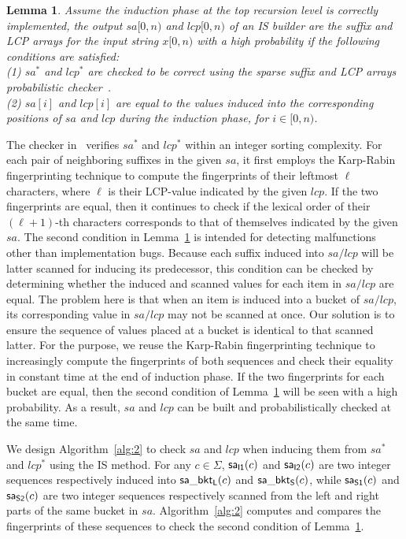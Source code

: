 \documentclass[10pt,journal,compsoc]{IEEEtran}
\newtheorem{lemma}[theorem]{Lemma}
\begin{document}
\begin{lemma} \label{lemma:3}
	Assume the induction phase at the top recursion level is correctly implemented, the output $sa[0, n)$ and $lcp[0, n)$ of an IS builder are the suffix and LCP arrays for the input string $x[0, n)$ with a high probability if the following conditions are satisfied: \\
	(1) $sa^*$ and $lcp^*$ are checked to be correct using the sparse suffix and LCP arrays probabilistic checker~\cite{wu2017}. \\
	(2) $sa[i]$ and $lcp[i]$ are equal to the values induced into the corresponding positions of $sa$ and $lcp$ during the induction phase, for $i \in [0, n)$. \\
\end{lemma}


The checker in~\cite{wu2017} verifies $sa^*$ and $lcp^*$ within an integer sorting complexity. For each pair of neighboring suffixes in the given $sa$, it first employs the Karp-Rabin fingerprinting technique to compute the fingerprints of their leftmost $\ell$ characters, where $\ell$ is their LCP-value indicated by the given $lcp$. If the two fingerprints are equal, then it continues to check if the lexical order of  their $(\ell + 1)$-th characters corresponds to that of themselves indicated by the given $sa$. The second condition in Lemma~\ref{lemma:3} is intended for detecting malfunctions other than implementation bugs. Because each suffix induced into $sa/lcp$ will be latter scanned for inducing its predecessor, this condition can be checked by determining whether the induced and scanned values for each item in $sa/lcp$ are equal. The problem here is that when an item is induced into a bucket of $sa/lcp$, its corresponding value in $sa/lcp$ may not be scanned at once. Our solution is to ensure the sequence of values placed at a bucket is identical to that scanned latter. For the purpose, we reuse the Karp-Rabin fingerprinting technique to increasingly compute the fingerprints of both sequences and check their equality in constant time at the end of induction phase. If the two fingerprints for each bucket are equal, then the second condition of Lemma~\ref{lemma:3} will be seen with a high probability. As a result, $sa$ and $lcp$ can be built and probabilistically checked at the same time. 

We design Algorithm~\ref{alg:2} to check $sa$ and $lcp$ when inducing them from $sa^*$ and $lcp^*$ using the IS method. For any $c \in \Sigma$, ${\sf sa_{I1}}(c)$ and ${\sf sa_{I2}}(c)$ are two integer sequences respectively induced into ${\sf sa\_bkt_L}(c)$ and ${\sf sa\_bkt_S}(c)$, while ${\sf sa_{S1}}(c)$ and ${\sf sa_{S2}}(c)$ are two integer sequences respectively scanned from the left and right parts of the same bucket in $sa$. Algorithm~\ref{alg:2} computes and compares the fingerprints of these sequences to check the second condition of Lemma~\ref{lemma:3}. 
\end{document}
